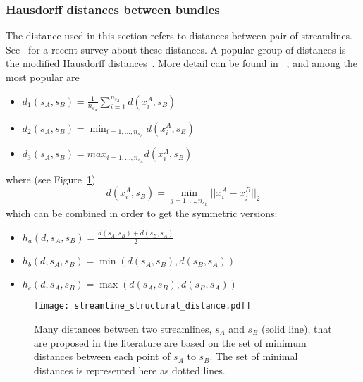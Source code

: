 \subsubsection{Hausdorff distances between bundles}
\label{subsec:experiments_quatification_hausdorff}
The distance used in this section refers to distances between pair of
streamlines. See~\cite{zhang2008identifying} for a recent survey about
these distances. A popular group of distances is the modified Hausdorff
distances~\cite{dubuisson1994modified}. More detail can be found in ~\cite{zhang2008identifying}, and among the most popular are
\begin{itemize}
	\item ${d}_1(s_A,s_B)=\frac{1}{n_{s_A}}\sum_{i=1}^{n_{s_A}}d({x}_i^A,s_B)$
	\item ${d}_2(s_A,s_B)=\min_{i=1,\ldots,n_{s_A}}d({x}_i^A,s_B)$
	\item ${d}_3(s_A,s_B)=max_{i=1,\ldots,n_{s_A}}d({x}_i^A,s_B)$
\end{itemize}
where (see Figure~\ref{fig:structural_distance})
\begin{equation}
\label{eq:distance_point_streamline}
d({x}_i^A, s_B) = \min_{j=1,\ldots,n_{s_B}}||{x}_i^A -{x}_j^B||_2
\end{equation}
which can be combined in order to get the symmetric versions:
\begin{itemize}
\item ${h}_a({d},s_A,s_B) = \frac{{d}(s_A,s_B)+{d}(s_B,s_A)}{2}$
\item ${h}_b({d},s_A,s_B) = \min({d}(s_A,s_B),{d}(s_B,s_A))$
\item ${h}_c({d},s_A,s_B) = \max ({d}(s_A,s_B),{d}(s_B,s_A))$
\end{itemize}

\begin{figure}
  \centering
  \texttt{[image: streamline\_structural\_distance.pdf]}
  \caption{Many distances between two streamlines, $s_A$ and $s_B$
    (solid line), that are proposed in the literature are based on the
    set of minimum distances between each point of $s_A$ to $s_B$.
    The set of minimal distances is represented here as dotted lines.}
  \label{fig:structural_distance}
\end{figure}


